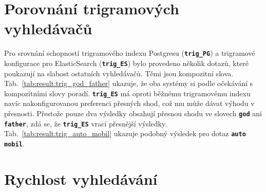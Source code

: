 \documentclass[11pt,letterpaper,oneside,openright]{book}
\newcommand{\bftt}[1]{\texttt{\textbf{#1}}}
\begin{document}
\mbox{}\mbox{}


\section{Porovnání trigramových vyhledávačů}
Pro srovnání schopností trigramového indexu Postgresu (\bftt{trig\_PG}) a
trigramové konfigurace pro ElasticSearch (\bftt{trig\_ES}) bylo provedeno
několik dotazů, které poukazují na slabost ostatních vyhledávačů. Těmi jsou
kompozitní slova. Tab.~\ref{tab:result:trig_god_father} ukazuje, že oba systémy
si podle očekávání s kompozitními slovy poradí. \bftt{trig\_ES} má oproti
běžnému trigramovému indexu navíc nakonfigurovanou preferenci přesných shod,
což mu může dávat výhodu v přesnosti. Přestože pouze dva výsledky obsahují
přesnou shodu ve slovech \bftt{god} ani \bftt{father}, zdá se, že
\bftt{trig\_ES} vrací přesnější výsledky. Tab.~\ref{tab:result:trig_auto_mobil}
ukazuje podobný výsledek pro dotaz \bftt{auto mobil}.

\mbox{}\mbox{}

\mbox{}\mbox{}



\clearpage
\section{Rychlost vyhledávání} \label{sec:rychlost_vyhledavani}

\end{document}
